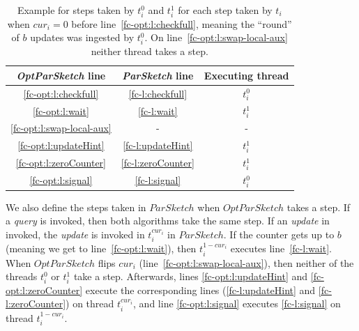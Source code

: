 \begin{table}[H]
    \begin{tabular}{c|c|c}
        \emph{OptParSketch} line & \emph{ParSketch} line & Executing thread\\[5pt]
        \hline
        \ref{fc-opt:l:checkfull} & \ref{fc-l:checkfull} & $t_i^0$\\[5pt]
        \ref{fc-opt:l:wait} & \ref{fc-l:wait}& $t_i^1$\\[5pt]
        \ref{fc-opt:l:swap-local-aux} & - & - \\[5pt]
        \ref{fc-opt:l:updateHint} & \ref{fc-l:updateHint} & $t_i^1$\\[5pt]
        \ref{fc-opt:l:zeroCounter} & \ref{fc-l:zeroCounter} & $t_i^1$\\[5pt]
        \ref{fc-opt:l:signal} & \ref{fc-l:signal} & $t_i^0$ 
    \end{tabular}
    \caption{Example for steps taken by $t_i^0$ and $t_i^1$ for each step taken by $t_i$ when $cur_i=0$ before line~\ref{fc-opt:l:checkfull},
    meaning the ``round'' of $b$ updates was ingested by $t_i^0$. On line~\ref{fc-opt:l:swap-local-aux} neither thread takes a step.}
    \label{fc-table:opt-simulation}
\end{table}

We also define the steps taken in $ParSketch$ when $OptParSketch$ takes a step. If a \emph{query} is invoked,
then both algorithms take the same step. If an \emph{update} in invoked, the  \emph{update} is invoked in
$t_i^{cur_i}$ in $ParSketch$. If the counter gets up to $b$ (meaning we get to line~\ref{fc-opt:l:wait}), then
$t_i^{1-cur_i}$ executes line~\ref{fc-l:wait}. When $OptParSketch$ flips $cur_i$ (line~\ref{fc-opt:l:swap-local-aux}),
then neither of the threads $t_i^0$ or $t_i^1$ take a step. Afterwards, lines \ref{fc-opt:l:updateHint} and \ref{fc-opt:l:zeroCounter} execute the corresponding lines (\ref{fc-l:updateHint} and \ref{fc-l:zeroCounter}) 
on thread $t_i^{cur_i}$, and line \ref{fc-opt:l:signal} executes \ref{fc-l:signal} on thread $t_i^{1-cur_i}$.

